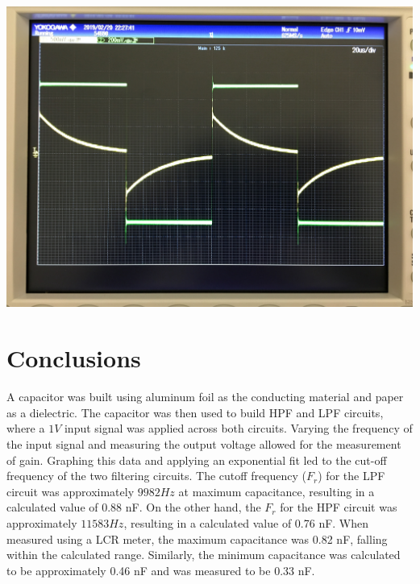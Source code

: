 \documentclass[journal]{IEEEtran}
\begin{document}
\begingroup
    \medskip
    \centering
    \includegraphics[width=\columnwidth]{images/lab4_2.jpg}
    \label{fig:square2}
    \medskip
\endgroup




\smallskip
\section{Conclusions}

\noindent A capacitor was built using aluminum foil as the conducting material and paper as a dielectric. The capacitor was then used to build HPF and LPF circuits, where a $1V$ input signal was applied across both circuits. Varying the frequency of the input signal and measuring the output voltage allowed for the measurement of gain. Graphing this data and applying an exponential fit led to the cut-off frequency of the two filtering circuits. The cutoff frequency ($F_{r}$) for the LPF circuit was approximately $9982 Hz$ at maximum capacitance, resulting in a calculated value of 0.88 nF. On the other hand, the $F_{r}$ for the HPF circuit was approximately $11583 Hz$, resulting in a calculated value of 0.76 nF. When measured using a LCR meter, the maximum capacitance was 0.82 nF, falling within the calculated range. Similarly, the minimum capacitance was calculated to be approximately 0.46 nF and was measured to be 0.33 nF.\\
\end{document}
